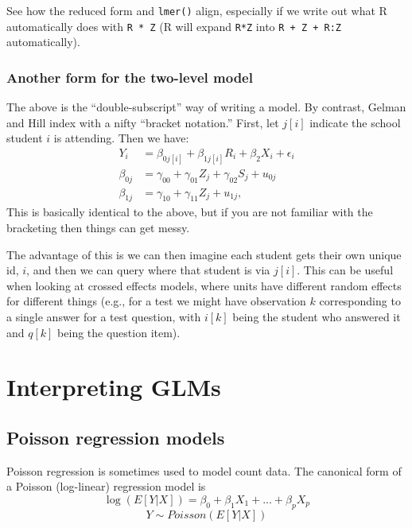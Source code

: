 \documentclass[
  letterpaper,
  DIV=11,
  numbers=noendperiod]{scrreprt}
\begin{document}
See how the reduced form and \texttt{lmer()} align, especially if we
write out what R automatically does with \texttt{R\ *\ Z} (R will expand
\texttt{R*Z} into \texttt{R\ +\ Z\ +\ R:Z} automatically).

\hypertarget{another-form-for-the-two-level-model}{%
\subsection{Another form for the two-level
model}\label{another-form-for-the-two-level-model}}

The above is the ``double-subscript'' way of writing a model. By
contrast, Gelman and Hill index with a nifty ``bracket notation.''
First, let \(j[i]\) indicate the school student \(i\) is attending. Then
we have: \[\begin{aligned}
Y_{i} &= \beta_{0j[i]} + \beta_{1j[i]} R_{i} + \beta_{2} X_{i} + \epsilon_{i} \\
\beta_{0j} &= \gamma_{00} + \gamma_{01} Z_{j} + \gamma_{02} S_{j} + u_{0j} \\
\beta_{1j} &= \gamma_{10} + \gamma_{11} Z_{j} + u_{1j},
\end{aligned}\] This is basically identical to the above, but if you are
not familiar with the bracketing then things can get messy.

The advantage of this is we can then imagine each student gets their own
unique id, \(i\), and then we can query where that student is via
\(j[i]\). This can be useful when looking at crossed effects models,
where units have different random effects for different things (e.g.,
for a test we might have observation \(k\) corresponding to a single
answer for a test question, with \(i[k]\) being the student who answered
it and \(q[k]\) being the question item).

\hypertarget{interpreting-glms}{%
\chapter{Interpreting GLMs}\label{interpreting-glms}}

\hypertarget{poisson-regression-models}{%
\section{Poisson regression models}\label{poisson-regression-models}}

Poisson regression is sometimes used to model count data. The canonical
form of a Poisson (log-linear) regression model is
\[\log(E[Y|X]) = \beta_0 + \beta_1X_1 + ... + \beta_pX_p\]
\[Y \sim Poisson(E[Y|X])\]
\end{document}
